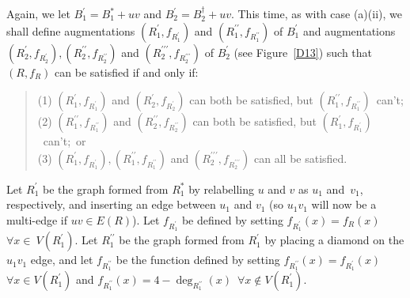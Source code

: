 \documentclass{article}
\newtheorem{Proof of Theorem}{Proof of Theorem}
\begin{document}
Again, we let $B_{1}^{\prime} = B_{1}^{*} + uv$
and $B_{2}^{\prime} = B_{2}^{\dag} + uv$.
This time, as with case (a)(ii),
we shall define augmentations 
$\left( R_{1}^{\prime},f_{R_{1}^{\prime}} \right)$ 
and $\left( R_{1}^{\prime\prime},f_{R_{1}^{\prime\prime}} \right)$ of $B_{1}^{\prime}$
and augmentations 
$\left( R_{2}^{\prime},f_{R_{2}^{\prime}} \right), \left( R_{2}^{\prime\prime},f_{R_{2}^{\prime\prime}} \right)$
and $\left( R_{2}^{\prime\prime\prime},f_{R_{2}^{\prime\prime\prime}} \right)$ of $B_{2}^{\prime}$
(see Figure~\ref{D13})
such that
$(R,f_{R})$ can be satisfied if and only if: 
\begin{quote}
(1) $\left( R_{1}^{\prime},f_{R_{1}^{\prime}} \right)$ and $\left( R_{2}^{\prime},f_{R_{2}^{\prime}} \right)$ 
can both be satisfied, 
but $\left( R_{1}^{\prime\prime},f_{R_{1}^{\prime\prime}} \right)$~can't; \\ 
(2) $\left( R_{1}^{\prime\prime},f_{R_{1}^{\prime\prime}} \right)$ 
and $\left( R_{2}^{\prime\prime},f_{R_{2}^{\prime\prime}} \right)$ 
can both be satisfied, 
but $\left( R_{1}^{\prime},f_{R_{1}^{\prime}} \right)$~can't;~or \\
(3) $\left( R_{1}^{\prime},f_{R_{1}^{\prime}} \right),\left( R_{1}^{\prime\prime},f_{R_{1}^{\prime\prime}} \right)$ 
and $\left( R_{2}^{\prime\prime\prime},f_{R_{2}^{\prime\prime\prime}} \right)$ can all be satisfied.
\end{quote}

Let $R_{1}^{\prime}$ be the graph formed from $R_{1}^{*}$ by relabelling $u$ and $v$ as $u_{1}$ and~$v_{1}$,
respectively,
and inserting an edge between $u_{1}$ and $v_{1}$
(so $u_{1}v_{1}$ will now be a multi-edge if $uv \in E(R)$).
Let $f_{R_{1}^{\prime}}$ be defined by setting $f_{R_{1}^{\prime}}(x) = f_{R}(x)$~$\forall x \in~\!V(R_{1}^{\prime})$.
Let $R_{1}^{\prime\prime}$ be the graph formed from $R_{1}^{\prime}$ by placing a diamond on the $u_{1}v_{1}$ edge,
and let $f_{R_{1}^{\prime\prime}}$ be the function defined by setting
$f_{R_{1}^{\prime\prime}}(x)=f_{R_{1}^{\prime}}(x)$~$\forall x \in V(R_{1}^{\prime})$
and $f_{R_{1}^{\prime\prime}}(x) = 4-\deg_{R_{1}^{\prime\prime}}(x)$~$\forall x \notin V(R_{1}^{\prime})$.
\end{document}

